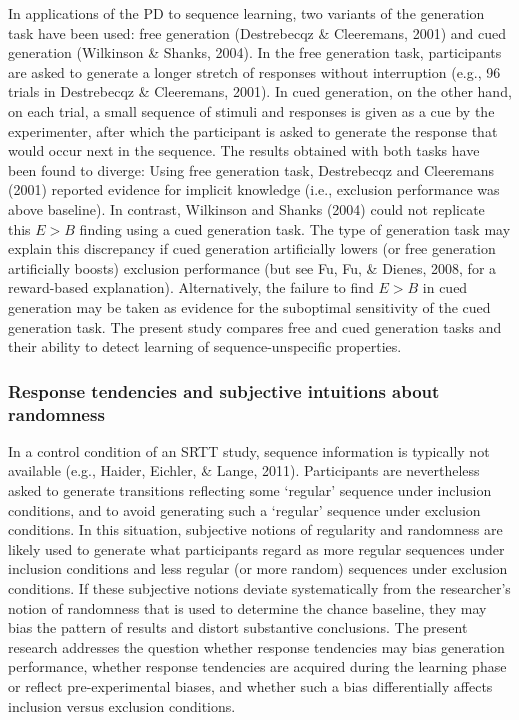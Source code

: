 \documentclass[
  english,
  man]{apa6}
\begin{document}
In applications of the PD to sequence learning, two variants of the generation task have been used: free generation (Destrebecqz \& Cleeremans, 2001) and cued generation (Wilkinson \& Shanks, 2004).
In the free generation task, participants are asked to generate a longer stretch of responses without interruption (e.g., 96 trials in Destrebecqz \& Cleeremans, 2001).
In cued generation, on the other hand, on each trial, a small sequence of stimuli and responses is given as a cue by the experimenter, after which the participant is asked to generate the response that would occur next in the sequence.
The results obtained with both tasks have been found to diverge: Using free generation task, Destrebecqz and Cleeremans (2001) reported evidence for implicit knowledge (i.e., exclusion performance was above baseline).
In contrast, Wilkinson and Shanks (2004) could not replicate this \(E>B\) finding using a cued generation task.
The type of generation task may explain this discrepancy if cued generation artificially lowers (or free generation artificially boosts) exclusion performance (but see Fu, Fu, \& Dienes, 2008, for a reward-based explanation).
Alternatively, the failure to find \(E>B\) in cued generation may be taken as evidence for the suboptimal sensitivity of the cued generation task.
The present study compares free and cued generation tasks and their ability to detect learning of sequence-unspecific properties.

\hypertarget{response-tendencies-and-subjective-intuitions-about-randomness}{%
\subsubsection{Response tendencies and subjective intuitions about randomness}\label{response-tendencies-and-subjective-intuitions-about-randomness}}

In a control condition of an SRTT study, sequence information is typically not available (e.g., Haider, Eichler, \& Lange, 2011).
Participants are nevertheless asked to generate transitions reflecting some `regular' sequence under inclusion conditions, and to avoid generating such a `regular' sequence under exclusion conditions.
In this situation, subjective notions of regularity and randomness are likely used to generate what participants regard as more regular sequences under inclusion conditions and less regular (or more random) sequences under exclusion conditions.
If these subjective notions deviate systematically from the researcher's notion of randomness that is used to determine the chance baseline, they may bias the pattern of results and distort substantive conclusions.
The present research addresses the question whether response tendencies may bias generation performance, whether response tendencies are acquired during the learning phase or reflect pre-experimental biases, and whether such a bias differentially affects inclusion versus exclusion conditions.
\end{document}
